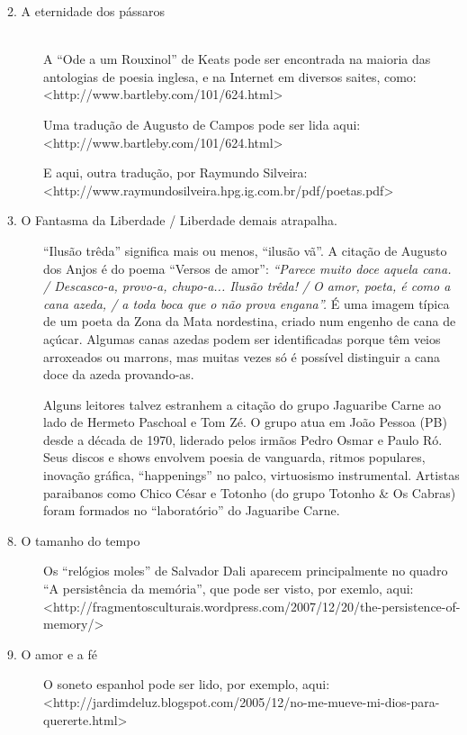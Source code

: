 \begin{description}
\item[2. A eternidade dos pássaros]\hfill\\
A “Ode a um Rouxinol” de Keats pode ser encontrada na maioria das
antologias de poesia inglesa, e na Internet em diversos saites,
como:\\
<http://www.bartleby.com/101/624.html>

Uma tradução de Augusto de Campos pode ser lida aqui: \\
<http://www.bartleby.com/101/624.html>

E aqui, outra tradução, por Raymundo Silveira:\\
<http://www.raymundosilveira.hpg.ig.com.br/pdf/poetas.pdf>

\item[3. O Fantasma da Liberdade / Liberdade demais atrapalha.]

“Ilusão trêda” significa mais ou menos, “ilusão vã”.  A citação de
Augusto dos Anjos é do poema “Versos de amor”: \textit{“Parece muito
doce aquela cana. / Descasco-a, provo-a, chupo-a... Ilusão trêda! / O
amor, poeta, é como a cana azeda, / a toda boca que o não prova
engana”.  } É uma imagem típica de um poeta da Zona da Mata
nordestina, criado num engenho de cana de açúcar.  Algumas canas
azedas podem ser identificadas porque têm veios arroxeados ou
marrons, mas muitas vezes só é possível distinguir a cana doce da
azeda provando-as.  

Alguns leitores talvez estranhem a citação do grupo Jaguaribe Carne ao
lado de Hermeto Paschoal e Tom Zé.  O grupo atua em João Pessoa (PB)
desde a década de 1970, liderado pelos irmãos Pedro Osmar e Paulo Ró.
 Seus discos e shows envolvem poesia de vanguarda, ritmos populares,
inovação gráfica, “happenings” no palco, virtuosismo instrumental. 
Artistas paraibanos como Chico César e Totonho (do grupo Totonho \&
Os Cabras) foram formados no “laboratório” do Jaguaribe Carne. 

\item[8. O tamanho do tempo]

Os “relógios moles” de Salvador Dali aparecem principalmente no quadro
“A persistência da memória”, que pode ser visto, por exemlo, aqui:\\
<http://fragmentosculturais.wordpress.com/2007/12/20/the-persistence-of-memory/>
 
\item[9. O amor e a fé]

O soneto espanhol pode ser lido, por exemplo, aqui:\\
<http://jardimdeluz.blogspot.com/2005/12/no-me-mueve-mi-dios-para-quererte.html>


\end{description}
